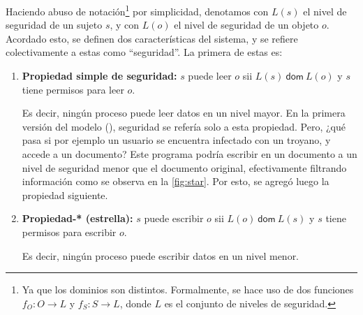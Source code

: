 \documentclass[main.tex]{subfiles}
\begin{document}
Haciendo abuso de notación\footnote{Ya que los dominios son distintos.
  Formalmente, se hace uso de dos funciones $f_O\colon O \to L$ y $f_S\colon S
\to L$, donde $L$ es el conjunto de niveles de seguridad.} por simplicidad,
denotamos con $L(s)$ el nivel de seguridad de un sujeto $s$, y con $L(o)$ el 
nivel de seguridad de un objeto $o$. Acordado esto, se definen dos
características del sistema, y se refiere colectivamente a estas como
``seguridad''. La primera de estas es:
\begin{enumerate}
  \item \textbf{Propiedad simple de seguridad\footnotemark:} $s$ puede leer $o$ sii $L(s)~\mathsf{dom}~L(o)$ y $s$ tiene permisos para leer $o$. 


    Es decir, ningún proceso puede leer datos en un nivel mayor. En la primera
    versión del modelo (\cite{BLP73}), seguridad se refería solo a esta
    propiedad.  Pero, ¿qué pasa si por ejemplo un usuario se encuentra infectado
    con un troyano, y accede a un documento? Este programa podría escribir en un
    documento a un nivel de seguridad menor que el documento original,
    efectivamente filtrando información como se observa en la
    \autoref{fig:star}. Por esto, se agregó luego la propiedad siguiente.
  \item \textbf{Propiedad-* (estrella)\footnotemark:} $s$ puede escribir $o$ sii $L(o)~\mathsf{dom}~L(s)$ y $s$ tiene permisos para escribir $o$.

Es decir, ningún proceso puede escribir datos en un nivel menor. 
\end{enumerate}
\end{document}
